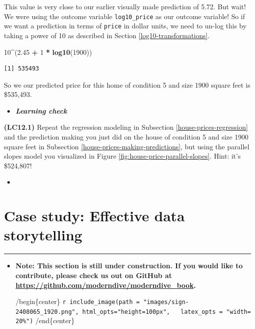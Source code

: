 \documentclass[12pt,]{krantz}
\makeatletter
\newenvironment{Shaded}{\begin{snugshade}}{\end{snugshade}}
\newcommand{\KeywordTok}[1]{\textcolor[rgb]{0.27,0.27,0.27}{\textbf{#1}}}
\newcommand{\DecValTok}[1]{\textcolor[rgb]{0.06,0.06,0.06}{#1}}
\newcommand{\FloatTok}[1]{\textcolor[rgb]{0.06,0.06,0.06}{#1}}
\newcommand{\StringTok}[1]{\textcolor[rgb]{0.5,0.5,0.5}{#1}}
\newcommand{\OperatorTok}[1]{\textcolor[rgb]{0.43,0.43,0.43}{\textbf{#1}}}
\newcommand{\NormalTok}[1]{#1}
\newenvironment{kframe}{%
\medskip{}
\setlength{\fboxsep}{.8em}
 \def\at@end@of@kframe{}%
 \ifinner\ifhmode%
  \def\at@end@of@kframe{\end{minipage}}%
  \begin{minipage}{\columnwidth}%
 \fi\fi%
 \def\FrameCommand##1{\hskip\@totalleftmargin \hskip-\fboxsep
 \colorbox{shadecolor}{##1}\hskip-\fboxsep
     \hskip-\linewidth \hskip-\@totalleftmargin \hskip\columnwidth}%
 \MakeFramed {\advance\hsize-\width
   \@totalleftmargin\z@ \linewidth\hsize
   \@setminipage}}%
 {\par\unskip\endMakeFramed%
 \at@end@of@kframe}
\renewenvironment{Shaded}{\begin{kframe}}{\end{kframe}}
\newenvironment{rmdblock}[1]
  {\begin{shaded*}
  \begin{itemize}
  \renewcommand{\labelitemi}{
    \raisebox{-.7\height}[0pt][0pt]{
    }
  }
  \item
  }
  {
  \end{itemize}
  \end{shaded*}
  }
\newenvironment{learncheck}
  {\begin{rmdblock}{warning}}
  {\end{rmdblock}}
\theoremstyle{definition}
\theoremstyle{definition}
\theoremstyle{definition}
\theoremstyle{remark}
\makeatother
\begin{document}
This value is very close to our earlier visually made prediction of
5.72. But wait! We were using the outcome variable \texttt{log10\_price}
as our outcome variable! So if we want a prediction in terms of
\texttt{price} in dollar units, we need to un-log this by taking a power
of 10 as described in Section \ref{log10-transformations}.

\begin{Shaded}
\begin{Highlighting}[]
\DecValTok{10}\OperatorTok{^}\NormalTok{(}\FloatTok{2.45} \OperatorTok{+}\StringTok{ }\DecValTok{1} \OperatorTok{*}\StringTok{ }\KeywordTok{log10}\NormalTok{(}\DecValTok{1900}\NormalTok{))}
\end{Highlighting}
\end{Shaded}

\begin{verbatim}
[1] 535493
\end{verbatim}

So we our predicted price for this home of condition 5 and size 1900
square feet is \$535,493.

\begin{learncheck}
\textbf{\emph{Learning check}}
\end{learncheck}

\textbf{(LC12.1)} Repeat the regression modeling in Subsection
\ref{house-prices-regression} and the prediction making you just did on
the house of condition 5 and size 1900 square feet in Subsection
\ref{house-prices-making-predictions}, but using the parallel slopes
model you visualized in Figure \ref{fig:house-price-parallel-slopes}.
Hint: it's \$524,807!

\begin{learncheck}

\end{learncheck}

\section{Case study: Effective data storytelling}\label{data-journalism}

\begin{center}\rule{0.5\linewidth}{\linethickness}\end{center}

\begin{learncheck}
\textbf{Note: This section is still under construction. If you would
like to contribute, please check us out on GitHub at
\url{https://github.com/moderndive/moderndive_book}.}

/begin\{center\}
\texttt{r\ include\_image(path\ =\ "images/sign-2408065\_1920.png",\ html\_opts="height=100px",\ \ \ latex\_opts\ =\ "width=20\%")}
/end\{center\}
\end{learncheck}
\end{document}
